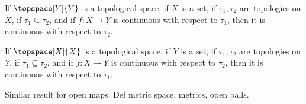 \documentclass{book}                                                           %
\begin{document}
            \begin{theorem}
                If $\topspace[Y]{Y}$ is a topological space, if $X$ is a set, if
                $\tau_{1},\tau_{2}$ are topologies on $X$, if
                $\tau_{1}\subseteq\tau_{2}$, and if $f:X\rightarrow{Y}$ is
                continuous with respect to $\tau_{1}$, then it is continuous with
                respect to $\tau_{2}$.
            \end{theorem}
            \begin{theorem}
                If $\topspace[X]{X}$ is a topological space, if $Y$ is a set, if
                $\tau_{1},\tau_{2}$ are topologies on $Y$, if
                $\tau_{1}\subseteq\tau_{2}$, and if $f:X\rightarrow{Y}$ is
                continuous with respect to $\tau_{2}$, then it is continuous with
                respect to $\tau_{1}$.
            \end{theorem}
            Similar result for open maps. Def metric space, metrics, open balls.
\end{document}
